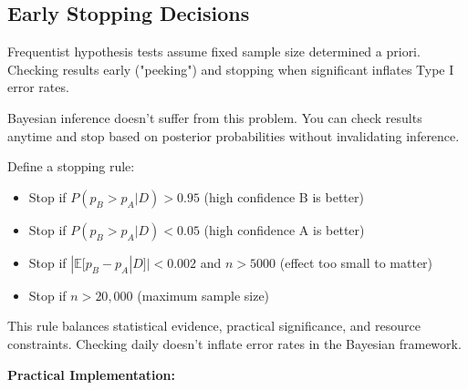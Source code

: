 \subsection{Early Stopping Decisions}

Frequentist hypothesis tests assume fixed sample size determined a priori. Checking results early ("peeking") and stopping when significant inflates Type I error rates.

Bayesian inference doesn't suffer from this problem. You can check results anytime and stop based on posterior probabilities without invalidating inference.

\begin{example}
Define a stopping rule:
\begin{itemize}
    \item Stop if $P(p_B > p_A | D) > 0.95$ (high confidence B is better)
    \item Stop if $P(p_B > p_A | D) < 0.05$ (high confidence A is better)
    \item Stop if $|\mathbb{E}[p_B - p_A | D]| < 0.002$ and $n > 5000$ (effect too small to matter)
    \item Stop if $n > 20,000$ (maximum sample size)
\end{itemize}

This rule balances statistical evidence, practical significance, and resource constraints. Checking daily doesn't inflate error rates in the Bayesian framework.
\end{example}

\textbf{Practical Implementation:}

